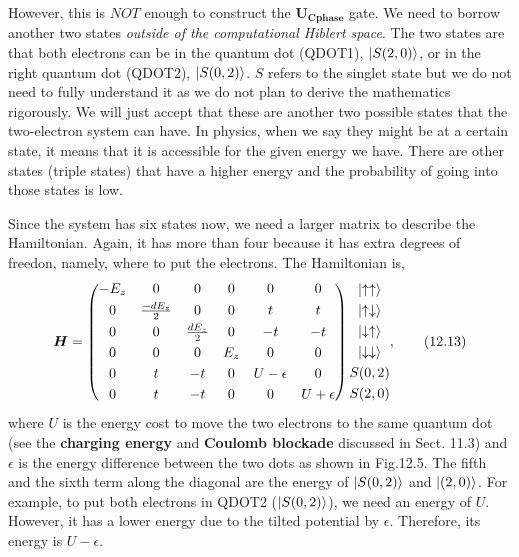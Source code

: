 \documentclass{article}
\begin{document}
However, this is $NOT$ enough to construct the $\boldsymbol{U_{Cphase}}$ gate. We need to borrow another two states 
\textit{outside of the computational Hiblert space}. The two states are that both electrons
can be in the quantum dot (QDOT1), $\ket{S(2,0)}$, or in the right quantum dot
(QDOT2), $\ket{S(0,2)}$. $S$ refers to the singlet state but we do not need to fully
understand it as we do not plan to derive the mathematics rigorously. We will just
accept that these are another two possible states that the two-electron system can have.
In physics, when we say they might be at a certain state, it means that it is accessible
for the given energy we have. There are other states (triple states) that have a higher energy
and the probability of going into those states is low.

Since the system has six states now, we need a larger matrix to describe the Hamiltonian.
Again, it has more than four because it has extra degrees of freedon, namely, where to put
the electrons. The Hamiltonian is,
\begin{equation}\label{eq 12.13}
  \boldsymbol{H}=\begin{pmatrix}
    -E_z&0&0&0&0&0\\[3pt]0&\frac{-dE_z}{2}&0&0&t&t\\[3pt]0&0&\frac{dE_z}{2}&0&-t&-t\\[3pt]
    0&0&0&E_z&0&0\\[3pt]0&t&-t&0&U-\epsilon&0\\[3pt]0&t&-t&0&0&U+\epsilon
  \end{pmatrix}
  \begin{matrix}
    \ket{\uparrow\uparrow}\\[3pt]
    \ket{\uparrow\downarrow}\\[3pt]
    \ket{\downarrow\uparrow}\\[3pt]
    \ket{\downarrow\downarrow}\\[3pt]
    S(0,2)\\[3pt]
    S(2,0)
  \end{matrix},\tag{12.13}
\end{equation}
where $U$ is the energy cost to move the two electrons to the same quantum dot (see the
\textbf{charging energy} and \textbf{Coulomb blockade} discussed in Sect. 11.3) and $\epsilon$
is the energy difference between the two dots as shown in Fig.12.5. The fifth and the sixth
term along the diagonal are the energy of $\ket{S(0,2)}$ and $\ket{(2,0)}$. For example, to put
both electrons in QDOT2 ($\ket{S(0,2)}$), we need an energy of $U$. However, it has a lower energy 
due to the tilted potential by $\epsilon$. Therefore, its energy is $U-\epsilon$.
\end{document}
